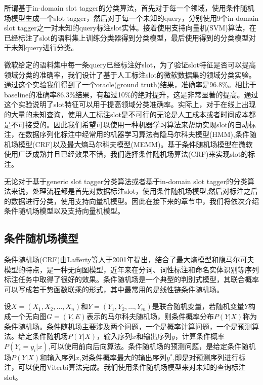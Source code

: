 \documentclass[master]{njuthesis}
\begin{document}
    所谓基于in-domain slot tagger的分类算法，首先对于每一个领域，使用条件随机场模型生成一个slot tagger，然后对于每一个未知的query，分别使用9个in-domain slot tagger之一对未知的query标注slot实体。接着使用支持向量机(SVM)算法，在已经标注了slot的语料集上训练分类器得到分类模型，最后使用得到的分类模型对于未知query进行分类。
    
    微软给定的语料集中每一条query已经标注好slot，为了验证slot特征是否可以提高领域分类的准确率，我们设计了基于人工标注slot的微软数据集的领域分类实验。通过这个实验我们得到了一个oracle(ground truth)结果，准确率是96.8\%。相比于baseline的准确率86.3\%结果，有超过10\%的绝对提升，这是非常显著的提高。通过这个实验说明了slot特征可以用于提高领域分类准确率。实际上，对于在线上出现的大量的未知查询，使用人工标注slot是不可行的无论是人工成本或者时间成本都是不可接受的。因此我们希望可以使用一种机器学习算法来帮助实现slot的自动标注，在数据序列化标注中经常用的机器学习算法有隐马尔科夫模型(HMM),条件随机场模型(CRF)以及最大熵马尔科夫模型(MEMM)。基于条件随机场模型在微软使用广泛成熟并且已经效果不错，我们选择条件随机场算法(CRF)来实现slot的标注。
    
    无论对于基于generic slot tagger分类算法或者基于in-domain slot tagger的分类算法来说，处理流程都是首先对数据标注slot，使用条件随机场模型,然后对标注之后的数据进行分类，使用支持向量机模型。因此在接下来的章节中，我们将依次介绍条件随机场模型以及支持向量机模型。

\subsection{条件随机场模型}

    条件随机场(CRF)由Lafferty等人于2001年提出，结合了最大熵模型和隐马尔可夫模型的特点，是一种无向图模型，近年来在分词、词性标注和命名实体识别等序列标注任务中取得了很好的效果。条件随机场是一个典型的判别式模型，其联合概率可以写成若干势函数联乘的形式，其中最常用的是线性链条件随机场。
    
    设$X = \left(X_1,X_2,\dots,X_n\right)$和$Y=\left(Y_1,Y_2,\dots,Y_m\right)$是联合随机变量，若随机变量$Y$构成一个无向图$G=\left(V,E\right)$表示的马尔科夫随机场，则条件概率分布$P\left(Y|X\right)$称为条件随机场。条件随机场主要涉及两个问题，一个是概率计算问题，一个是预测算法。给定条件随机场$P\left(Y|X\right)$，输入序列$x$和输出序列$y$，计算条件概率$P\left(Y_i=y_i|x\right)$,可以使用前向后向算法。条件随机场的预测问题，是给定条件随机场$P\left(Y|X\right)$和输入序列$x$,对条件概率最大的输出序列$y^\ast$,即是对预测序列进行标注，可以使用Viterbi算法完成。我们使用条件随机场模型来对未知的查询标注slot。
\end{document}
